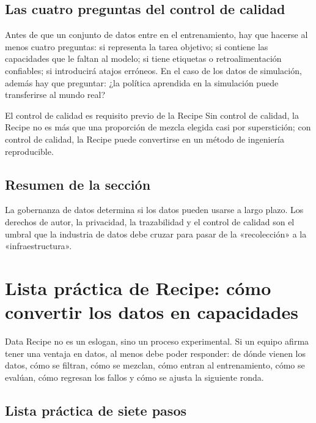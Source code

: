 \documentclass[a4paper]{article}
\begin{document}
\subsection{Las cuatro preguntas del control de calidad}

Antes de que un conjunto de datos entre en el entrenamiento, hay que hacerse al menos cuatro preguntas: si representa la tarea objetivo; si contiene las capacidades que le faltan al modelo; si tiene etiquetas o retroalimentación confiables; si introducirá atajos erróneos. En el caso de los datos de simulación, además hay que preguntar: ¿la política aprendida en la simulación puede transferirse al mundo real?

\begin{importantbox}{El control de calidad es requisito previo de la Recipe}
Sin control de calidad, la Recipe no es más que una proporción de mezcla elegida casi por superstición; con control de calidad, la Recipe puede convertirse en un método de ingeniería reproducible.
\end{importantbox}

\subsection{Resumen de la sección}

La gobernanza de datos determina si los datos pueden usarse a largo plazo. Los derechos de autor, la privacidad, la trazabilidad y el control de calidad son el umbral que la industria de datos debe cruzar para pasar de la «recolección» a la «infraestructura».
\section{Lista práctica de Recipe: cómo convertir los datos en capacidades}

Data Recipe no es un eslogan, sino un proceso experimental. Si un equipo afirma tener una ventaja en datos, al menos debe poder responder: de dónde vienen los datos, cómo se filtran, cómo se mezclan, cómo entran al entrenamiento, cómo se evalúan, cómo regresan los fallos y cómo se ajusta la siguiente ronda.

\subsection{Lista práctica de siete pasos}
\end{document}
